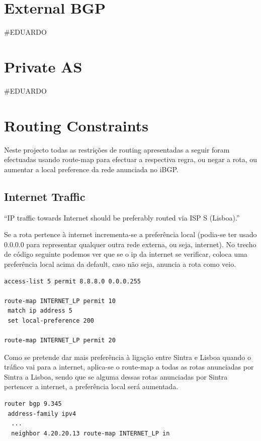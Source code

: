 \documentclass[11pt,a4paper]{report}
\begin{document}
\section{External BGP}
\#EDUARDO
\section{Private AS}
\#EDUARDO

\section{Routing Constraints}

Neste projecto todas as restrições de routing apresentadas a seguir foram efectuadas usando route-map para efectuar a respectiva regra, ou negar a rota, ou aumentar a local preference da rede anunciada no iBGP.

\subsection{Internet Traffic}

``IP traffic towards Internet should be preferably routed via ISP S (Lisboa).''
\newline

Se a rota pertence à internet incrementa-se a preferência local (podia-se ter usado 0.0.0.0 para representar qualquer outra rede externa, ou seja, internet). No trecho de código seguinte podemos ver que se o ip da internet se verificar, coloca uma preferência local acima da default, caso não seja, anuncia a rota como veio.

\begin{lstlisting}
access-list 5 permit 8.8.8.0 0.0.0.255

route-map INTERNET_LP permit 10
 match ip address 5
 set local-preference 200

route-map INTERNET_LP permit 20
\end{lstlisting}

Como se pretende dar mais preferência à ligação entre Sintra e Lisboa quando o tráfico vai para a internet, aplica-se o route-map a todas as rotas anunciadas por Sintra a Lisboa, sendo que se alguma dessas rotas anunciadas por Sintra pertencer a internet, a preferência local será aumentada.

\begin{lstlisting}
router bgp 9.345
 address-family ipv4
  ...
  neighbor 4.20.20.13 route-map INTERNET_LP in
\end{lstlisting}
\end{document}
